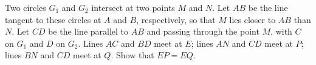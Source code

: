 Two circles $G_1$ and $G_2$ intersect at two points $M$ and $N$.
Let $AB$ be the line tangent to these circles at $A$ and $B$,
respectively, so that $M$ lies closer to $AB$ than $N$.
Let $CD$ be the line parallel to $AB$
and passing through the point $M$,
with $C$ on $G_1$ and $D$ on $G_2$.
Lines $AC$ and $BD$ meet at $E$; lines $AN$ and $CD$ meet at $P$;
lines $BN$ and $CD$ meet at $Q$.
Show that $EP = EQ$.